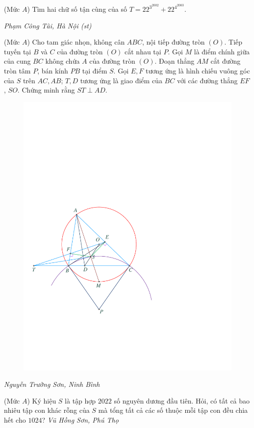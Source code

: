 \begin{multicols}{2}
	(Mức $A$) Tìm hai chữ số tận cùng của số $T=22^{3^{2002}}+22^{4^{2003}}$.
	\begin{flushright}
		\textit{Phạm Công Tài, Hà Nội (st)}
	\end{flushright}
	{}
	(Mức $A$) Cho tam giác nhọn, không cân $A B C$, nội tiếp đường tròn $(O)$. Tiếp tuyến tại $B$ và $C$ của đường tròn $(O)$ cắt nhau tại $P$. Gọi $M$ là điểm chính giữa của cung $B C$ không chứa $A$ của đường tròn $(O)$. Đoạn thẳng $A M$ cắt đường tròn tâm $P$, bán kính $P B$ tại điểm $S$. Gọi $E, F$ tương ứng là hình chiếu vuông góc của $S$ trên $A C, A B$; $T, D$ tương ứng là giao điểm của $B C$ với các đường thẳng $E F$, $SO$.  Chứng minh rằng $ST \perp A D$.
	\begin{figure}[H]
		\centering
		\vspace*{-5pt}
		\captionsetup{labelformat= empty, justification=centering}
		\includegraphics[width=0.95\linewidth]{P639}
		\vspace*{-10pt}
	\end{figure}
	\begin{flushright}
		\textit{Nguyễn Trường Sơn, Ninh Bình}
	\end{flushright}
	{}
	(Mức $A$) Ký hiệu $S$ là tập hợp $2022$ số nguyên dương đầu tiên. Hỏi, có tất cả bao nhiêu tập con khác rỗng của $S$ mà tổng tất cả các số thuộc mỗi tập con đều chia hết cho $1024$?
	\vskip 0.05cm
	\hfill	\textit{Vũ Hồng Sơn, Phú Thọ}
\end{multicols}
